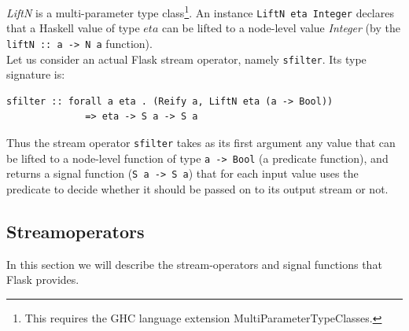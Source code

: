 \documentclass[a4paper, oneside, final]{memoir}
\begin{document}
\textit{LiftN} is a multi-parameter type class\footnote{This requires
  the GHC language extension MultiParameterTypeClasses.}. An instance
\texttt{LiftN eta Integer} declares that a Haskell value of type $eta$
can be lifted to a node-level value \textit{Integer} (by the
\texttt{liftN :: a -> N a} function).\\

\noindent
Let us consider an actual Flask stream operator, namely
\texttt{sfilter}. Its type signature is:

\begin{verbatim}
sfilter :: forall a eta . (Reify a, LiftN eta (a -> Bool))
              => eta -> S a -> S a
\end{verbatim}

Thus the stream operator \texttt{sfilter} takes as its first argument
any value that can be lifted to a node-level function of type
\texttt{a -> Bool} (a predicate function), and returns a signal
function (\texttt{S a -> S a}) that for each input value uses the
predicate to decide whether it should be passed on to its output
stream or not.

\newpage
\subsection{Streamoperators}
\label{sec:streamoperators}
In this section we will describe the stream-operators and signal
functions that Flask provides.
\end{document}
